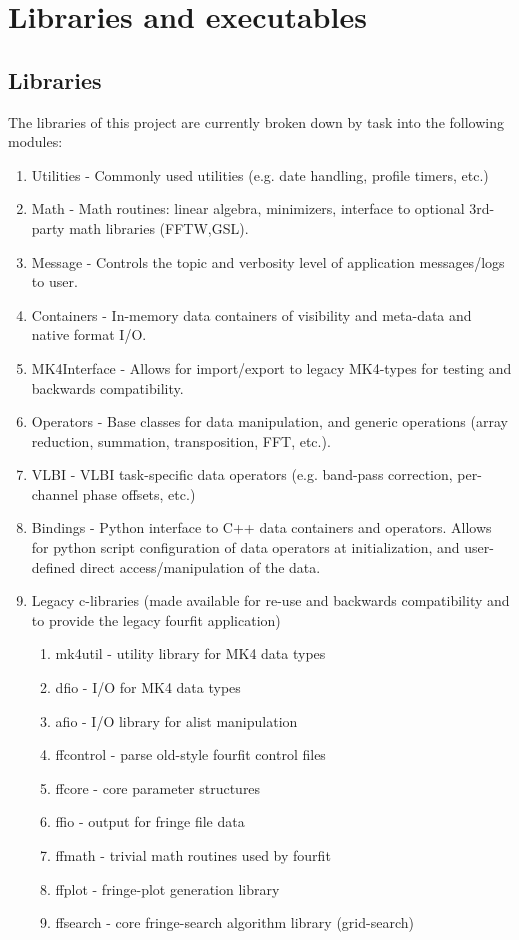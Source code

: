 \documentclass[hidelinks]{article}
\let\Oldsection\section
\renewcommand{\section}{\FloatBarrier\Oldsection}
\let\Oldsubsection\subsection
\renewcommand{\subsection}{\FloatBarrier\Oldsubsection}
\begin{document}
\section{Libraries and executables}

\subsection{Libraries}

The libraries of this project are currently broken down by task into the following modules:

\begin{enumerate}
     \item Utilities - Commonly used utilities (e.g. date handling, profile timers, etc.)
     \item Math - Math routines: linear algebra, minimizers, interface to optional 3rd-party math libraries (FFTW,GSL).
     \item Message - Controls the topic and verbosity level of application messages/logs to user.
     \item Containers - In-memory data containers of visibility and meta-data and native format I/O.
     \item MK4Interface - Allows for import/export to legacy MK4-types for testing and backwards compatibility.
     \item Operators - Base classes for data manipulation, and generic operations (array reduction, summation, transposition, FFT, etc.).
     \item VLBI - VLBI task-specific data operators (e.g. band-pass correction, per-channel phase offsets, etc.)
     \item Bindings - Python interface to C++ data containers and operators. Allows for python script configuration of data 
     operators at initialization, and user-defined direct access/manipulation of the data.
    \item  Legacy c-libraries (made available for re-use and backwards compatibility and to provide the legacy fourfit application)
    \begin{enumerate}
        \item mk4util - utility library for MK4 data types
        \item dfio - I/O for MK4 data types
        \item afio - I/O library for alist manipulation
        \item ffcontrol - parse old-style fourfit control files 
        \item ffcore - core parameter structures
        \item ffio - output for fringe file data
        \item ffmath - trivial math routines used by fourfit
        \item ffplot - fringe-plot generation library 
        \item ffsearch - core fringe-search algorithm library (grid-search)
    \end{enumerate}
\end{enumerate}
\end{document}
